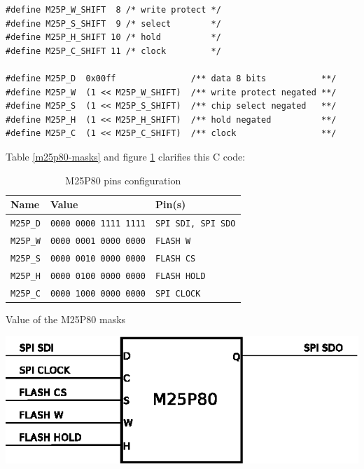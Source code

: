 \documentclass[a4paper,10pt]{report}
\begin{document}
\begin{verbatim}
#define M25P_W_SHIFT  8 /* write protect */
#define M25P_S_SHIFT  9 /* select        */
#define M25P_H_SHIFT 10 /* hold          */
#define M25P_C_SHIFT 11 /* clock         */

#define M25P_D  0x00ff               /** data 8 bits           **/
#define M25P_W  (1 << M25P_W_SHIFT)  /** write protect negated **/
#define M25P_S  (1 << M25P_S_SHIFT)  /** chip select negated   **/
#define M25P_H  (1 << M25P_H_SHIFT)  /** hold negated          **/
#define M25P_C  (1 << M25P_C_SHIFT)  /** clock                 **/
\end{verbatim}

\medskip
Table \ref{m25p80-masks} and figure \ref{wsim-m25p80} clarifies this C code:

\begin{table}[!h]
  \begin{minipage}[b]{0.50\linewidth}
    \begin{center}
    \begin{tabular}{|l|l|l|}
    \hline
      \rowcolor[gray]{0.9} \textbf{Name} & \textbf{Value} & \textbf{Pin(s)} \\
    \hline
      \verb$M25P_D$ & \verb$0000 0000 1111 1111$ & \verb$SPI SDI, SPI SDO$ \\
    \hline
      \verb$M25P_W$ & \verb$0000 0001 0000 0000$ & \verb$FLASH W$ \\
    \hline
      \verb$M25P_S$ & \verb$0000 0010 0000 0000$ & \verb$FLASH CS$ \\
    \hline
      \verb$M25P_H$ & \verb$0000 0100 0000 0000$ & \verb$FLASH HOLD$ \\
    \hline
      \verb$M25P_C$ & \verb$0000 1000 0000 0000$ & \verb$SPI CLOCK$ \\
    \hline
    \end{tabular}
    \end{center}
    \caption{Value of the M25P80 masks}
    \label{m25p80-masks}
  \end{minipage}\hfill
    \begin{minipage}[b]{0.40\linewidth}
    \begin{center}
      \centering \includegraphics[scale=0.8]{figures/wsim_m25p80.eps}
    \end{center}
    \caption{M25P80 pins configuration}
    \label{wsim-m25p80}
  \end{minipage}
\end{table}
\end{document}
